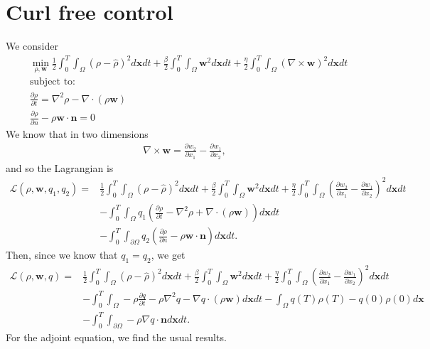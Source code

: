 \documentclass[11pt, a4paper]{article}
\theoremstyle{definition}
\newcommand{\w}{\mathbf{w}}
\newcommand{\x}{\mathbf{x}}
\newcommand{\n}{\mathbf{n}}
\newcommand{\hr}{\widehat \rho}
\begin{document}
\section{Curl free control}	
We consider
\begin{align*}
	&\min_{\rho, \w} \frac{1}{2}\int_0^T \int_\Omega \left(\rho - \hr\right)^2 d\x dt + \frac{\beta}{2}\int_0^T \int_\Omega \w^2 d\x dt + \frac{\eta}{2}\int_0^T \int_\Omega \left(\nabla \times \w \right)^2 d\x dt\\
	&\text{subject to:}\\
	& \frac{\partial \rho}{\partial t} = \nabla^2 \rho - \nabla \cdot \left(\rho \w\right)\\
	& \frac{\partial \rho}{\partial n} - \rho \w \cdot \n = 0
\end{align*}
We know that in two dimensions
\begin{align*}
    \nabla \times \w = \frac{\partial w_2}{\partial x_1}  - \frac{\partial w_1}{\partial x_2},
\end{align*}
and so the Lagrangian is
\begin{align*}
	\mathcal L (\rho, \w ,q_1, q_2) =& \frac{1}{2}\int_0^T \int_\Omega \left(\rho - \hr\right)^2 d\x dt + \frac{\beta}{2}\int_0^T \int_\Omega \w^2 d\x dt + \frac{\eta}{2}\int_0^T \int_\Omega \left(\frac{\partial w_2}{\partial x_1}  - \frac{\partial w_1}{\partial x_2} \right)^2 d\x dt\\
	&- \int_0^T \int_\Omega q_1 \left(\frac{\partial \rho}{\partial t} - \nabla^2 \rho + \nabla \cdot \left(\rho \w\right) \right) d \x dt \\
	&- \int_0^T \int_{\partial \Omega} q_2\left(\frac{\partial \rho}{\partial n} - \rho \w \cdot \n \right) d\x dt.
\end{align*}
Then, since we know that $q_1 = q_2$, we get
\begin{align*}
	\mathcal L (\rho, \w ,q) =& \frac{1}{2}\int_0^T \int_\Omega \left(\rho - \hr\right)^2 d\x dt + \frac{\beta}{2}\int_0^T \int_\Omega \w^2 d\x dt + \frac{\eta}{2}\int_0^T \int_\Omega \left(\frac{\partial w_2}{\partial x_1}  - \frac{\partial w_1}{\partial x_2} \right)^2 d\x dt\\
	&- \int_0^T \int_\Omega -\rho\frac{\partial q}{\partial t} - \rho \nabla^2 q - \nabla q \cdot \left(\rho \w\right) d \x dt  - \int_\Omega q(T) \rho(T) - q(0) \rho(0) d\x\\
	&- \int_0^T \int_{\partial \Omega}  - \rho \nabla q \cdot \n  d\x dt.
\end{align*}
For the adjoint equation, we find the usual results.
\end{document}

